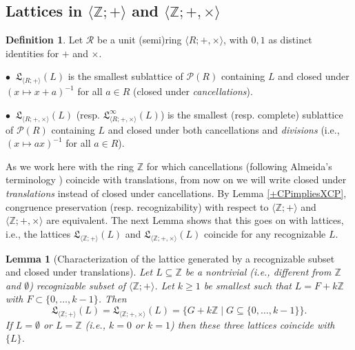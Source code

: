 \documentclass[11pt,a4paper]{article}
\newtheorem{lemma}[theorem]{Lemma}
\theoremstyle{definition} %
\newtheorem{definition}[theorem]{Definition}
\newtheorem{notation}[theorem]{Notation}
\newcommand\+[1]{\mathcal{#1}} %
\newcommand{\Z}{{\mathbb Z}}     %
\newcommand{\Latt}{{\mathfrak{L}}}
\begin{document}
\subsection{Lattices in $ \langle  \Z ;+\rangle$ and $ \langle  \Z ;+,\times\rangle$}\label{ss lattices in Z+ Z+x}


\begin{definition} Let  $\+R$ be a unit (semi)ring $\langle R;+,\times\rangle$, with $0,1$
as distinct identities for $+$ and $\times$. 

$\bullet\ $ $\Latt_{\langle R;+\rangle}(L)$ is the smallest sublattice of  $\+P(R)$ containing $L$
and closed under $(x\mapsto x+a)^{-1}$ for all $a\in R$
 (closed under {\em cancellations}). 

 $\bullet\ $  $\Latt_{\langle R;+,\times\rangle}(L)$ (resp.\! $\Latt^\infty_{\langle R;+,\times\rangle}(L)$)
 is the smallest (resp.\! complete) sublattice of  $\+P(R)$ containing $L$ and closed under both cancellations and {\em divisions} 
(i.e., $(x\mapsto ax)^{-1}$ for all $a\in R$).
\end{definition}

 As we  work  here with the ring $\Z$ for which cancellations (following Almeida's terminology \cite{almeida})  coincide with translations,  from now on we will write closed under {\em translations} instead of closed under  cancellations.
By Lemma \ref{+CPimpliesXCP}, congruence preservation (resp.\! recognizability) with respect to $\langle  \Z ;+\rangle$ and $\langle  \Z ;+,\times\rangle$ are equivalent. The next Lemma shows that 
 this goes on with lattices, i.e., 
the lattices $\Latt_{\langle  \Z ;+\rangle}(L)$ and $\Latt_{\langle  \Z ;+,\times\rangle}(L)$ coincide for any recognizable $L$.
%
%
\begin{lemma}[Characterization of the lattice generated by a recognizable subset and closed under translations]\label{l:lattice L Z}
Let $L\subseteq\Z$ be a nontrivial (i.e., different from $\Z$ and  $\emptyset$) recognizable subset of   $\langle  \Z ;+\rangle$.
Let $k\geq1$ be smallest such that $L=F+k\Z$ with $F\subset\{0,\ldots,k-1\}$.
Then 
\[\Latt_{\langle  \Z ;+\rangle}(L)=
\Latt_{\langle  \Z ;+,\times\rangle}(L)=\{G+k\Z\mid G\subseteq\{0,\ldots,k-1\}\}.\]
\noindent 
 If $L=\emptyset$ or $L=\Z$ (i.e., $k=0$ or $k=1$)
then these three lattices coincide with $\{L\}$.
\end{lemma}
%

\end{document}
